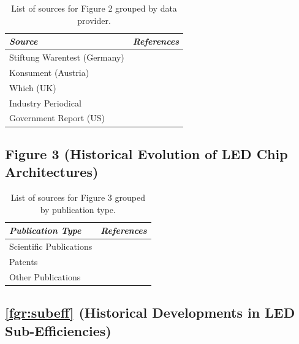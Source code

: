 \documentclass[parskip=full]{article}
\begin{document}
\begin{table}[h!]
    \caption{List of sources for Figure 2 grouped by data provider.}
    \begin{NiceTabularX}{\textwidth}{|l|X|}
    \hline
    \textit{Source} & \textit{References} \\
    \hline
    Stiftung Warentest (Germany) & \cite{Warentest2008}\cite{Warentest2009_1}\cite{Warentest2009_2}\cite{Warentest2010_1}\cite{Warentest2010_2}\cite{Warentest2011}\cite{Warentest2012}\cite{Warentest2013}\cite{Warentest2014_1}\cite{Warentest2014_2}\cite{Warentest2015}\cite{Warentest2016_1}\cite{Warentest2016_2}\cite{Warentest2018} \\
    \hline
    Konsument (Austria) & \cite{Konsument2010} \\
    \hline
    Which (UK) & \cite{Which2020} \\
    \hline
    Industry Periodical & \cite{PM2020} \\
    \hline
    Government Report (US) & \cite{council2013assessment} \\
    \hline
    \end{NiceTabularX}
\end{table}

\subsection{Figure 3 (Historical Evolution of LED Chip Architectures)}

\begin{table}[h!]
\caption{List of sources for Figure 3 grouped by publication type.}
    \begin{NiceTabularX}{\textwidth}{|l|X|}
    \hline
    \textit{Publication Type} & \textit{References} \\
    \hline
    Scientific Publications & \cite{plossl2010wafer}\cite{bierhuizen2007performance}\cite{gencc2019distributed}\cite{chong2014performance} \\
    \hline
    Patents & \cite{patent1999uemura}\cite{patent1998takaoka}\cite{patent1999komaki}\cite{patent1999komaki}\cite{ludowise2006resonant}\cite{camras2005iii}\cite{steigerwald2004contacting} \\
    \hline
    Other Publications & \cite{craford2015}\cite{sun2016}\cite{yole2013packaging} \\
    \hline
    \end{NiceTabularX}
\end{table}

\subsection{\cref{fgr:subeff} (Historical Developments in LED Sub-Efficiencies)}
\end{document}
